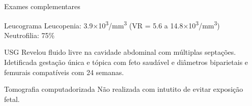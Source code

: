 \begin{frame}{Exames complementares}
    \begin{block}{Leucograma}
    Leucopenia: 3.9×10\textsuperscript{3}/mm\textsuperscript{3} (VR = 5.6 a 14.8×10\textsuperscript{3}/mm\textsuperscript{3})\\
    Neutrofilia: 75\%
    \end{block}

    \begin{block}{USG}
    Revelou fluido livre na cavidade abdominal com múltiplas septações. Idetificada gestação única e tópica com feto saudável e diâmetros biparietais e femurais compatíveis com 24 semanas.
    \end{block}
    
    \begin{block}{Tomografia computadorizada}
    Não realizada com intutito de evitar exposição fetal.
    \end{block}
\end{frame}